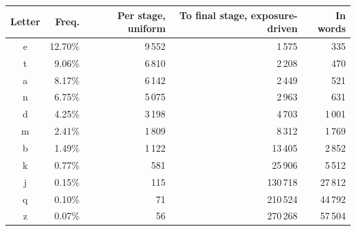 \begin{tabular}{crrrr}
\toprule
Letter & Freq. & Per stage, uniform & To final stage, exposure-driven & In words\\
\midrule
e & 12.70\% & 9\,552 & 1\,575 & 335\\
t & 9.06\% & 6\,810 & 2\,208 & 470\\
a & 8.17\% & 6\,142 & 2\,449 & 521\\
n & 6.75\% & 5\,075 & 2\,963 & 631\\
d & 4.25\% & 3\,198 & 4\,703 & 1\,001\\
m & 2.41\% & 1\,809 & 8\,312 & 1\,769\\
b & 1.49\% & 1\,122 & 13\,405 & 2\,852\\
k & 0.77\% & 581 & 25\,906 & 5\,512\\
j & 0.15\% & 115 & 130\,718 & 27\,812\\
q & 0.10\% & 71 & 210\,524 & 44\,792\\
z & 0.07\% & 56 & 270\,268 & 57\,504\\
\bottomrule
\end{tabular}
